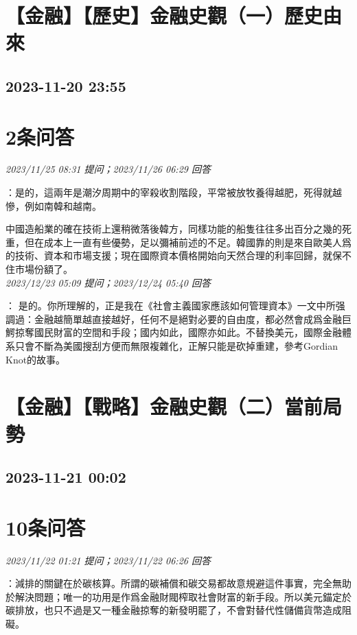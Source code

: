 \documentclass[twocolumn]{ctexart}
\begin{document}
\section{【金融】【歷史】金融史觀（一）歷史由來}
\subsection{2023-11-20 23:55}


\section{2条问答}

\textit{\hfill\noindent\small 2023/11/25 08:31 提问；2023/11/26 06:29 回答}

：是的，這兩年是潮汐周期中的宰殺收割階段，平常被放牧養得越肥，死得就越慘，例如南韓和越南。

中國造船業的確在技術上還稍微落後韓方，同樣功能的船隻往往多出百分之幾的死重，但在成本上一直有些優勢，足以彌補前述的不足。韓國靠的則是來自歐美人爲的技術、資本和市場支援；現在國際資本價格開始向天然合理的利率回歸，就保不住市場份額了。
\\

\textit{\hfill\noindent\small 2023/12/23 05:09 提问；2023/12/24 05:40 回答}

：
是的。你所理解的，正是我在《社會主義國家應該如何管理資本》一文中所强調過：金融越簡單越直接越好，任何不是絕對必要的自由度，都必然會成爲金融巨鰐掠奪國民財富的空間和手段；國内如此，國際亦如此。不替換美元，國際金融體系只會不斷為美國搜刮方便而無限複雜化，正解只能是砍掉重建，參考Gordian Knot的故事。
\\


\section{【金融】【戰略】金融史觀（二）當前局勢}
\subsection{2023-11-21 00:02}


\section{10条问答}

\textit{\hfill\noindent\small 2023/11/22 01:21 提问；2023/11/22 06:26 回答}

：減排的關鍵在於碳核算。所謂的碳補償和碳交易都故意規避這件事實，完全無助於解決問題；唯一的功用是作爲金融財閥榨取社會財富的新手段。所以美元錨定於碳排放，也只不過是又一種金融掠奪的新發明罷了，不會對替代性儲備貨幣造成阻礙。
\\
\end{document}
